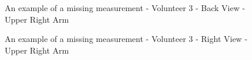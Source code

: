 \begin{figure}[ht]
	\centering
	{%
		\setlength{\fboxsep}{0pt}%
		\setlength{\fboxrule}{0.5pt}%
		}
	\caption{An example of a missing measurement - Volunteer 3 - Back View - Upper Right Arm}
	\label{fig:volunteer3Back}
\end{figure}

\begin{figure}[ht]
	\centering
	{%
		\setlength{\fboxsep}{0pt}%
		\setlength{\fboxrule}{0.5pt}%
		}
	\caption{An example of a missing measurement - Volunteer 3 - Right View - Upper Right Arm}
	\label{fig:volunteer3Right}
\end{figure}

